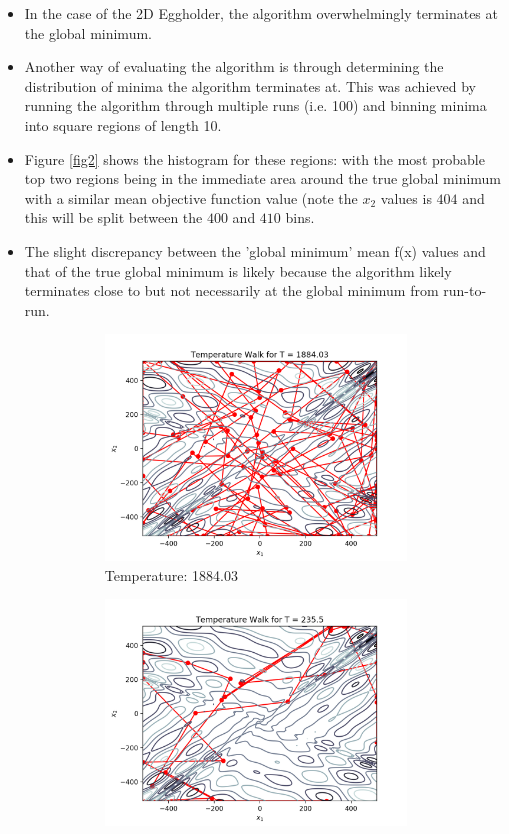 \documentclass[12pt]{article}
\begin{document}
\begin{enumerate}
\begin{enumerate}
\begin{itemize}
		\item In the case of the 2D Eggholder, the algorithm overwhelmingly terminates at the global minimum.
		\item Another way of evaluating the algorithm is through determining the distribution of minima the algorithm terminates at. This was achieved by running the algorithm through multiple runs (i.e. 100) and binning minima into square regions of length 10. 
		\item Figure \ref{fig2} shows the histogram for these regions: with the most probable top two regions being in the immediate area around the true global minimum with a similar mean objective function value (note the $x_{2}$ values is $404$ and this will be split between the $400$ and $410$ bins. 
		\item The slight discrepancy between the 'global minimum' mean f(x) values and that of the true global minimum is likely because the algorithm likely terminates close to but not necessarily at the global minimum from run-to-run.
		\begin{figure}[ht]
		\centering
		\begin{subfigure}{8cm}
		\centering\includegraphics[width=8cm]{a_T_1}
		\caption{Temperature: 1884.03}
		\end{subfigure}%
		\begin{subfigure}{8cm}
		\centering\includegraphics[width=8cm]{a_T_2}

\end{subfigure}
\end{figure}
\end{itemize}
\end{enumerate}
\end{enumerate}
\end{document}
